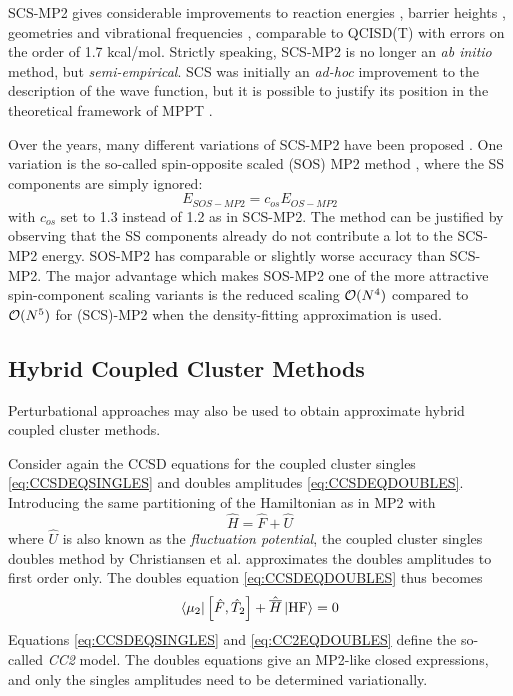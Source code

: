 SCS-MP2 gives considerable improvements to reaction energies \cite{Gri2003}, barrier heights \cite{Gou2004,Bul2004}, geometries and vibrational frequencies \cite{Ger2004}, comparable to QCISD(T) with errors on the order of 1.7 kcal/mol. Strictly speaking, SCS-MP2 is no longer an \emph{ab initio} method, but \emph{semi-empirical}. SCS was initially an \emph{ad-hoc} improvement to the description of the wave function, but it is possible to justify its position in the theoretical framework of MPPT \cite{Sza2006,Fin2010}. 

Over the years, many different variations of SCS-MP2 have been proposed \cite{Jun2004,Loc2005,Dis2007,Hil2007}. One variation is the so-called spin-opposite scaled (SOS) MP2 method \cite{Jun2004}, where the SS components are simply ignored:
\begin{equation}
E_{SOS-MP2} = c_{os} E_{OS-MP2}
\end{equation}
\noindent with $c_{os}$ set to 1.3 instead of 1.2 as in SCS-MP2. The method can be justified by observing that the SS components already do not contribute a lot to the SCS-MP2 energy. SOS-MP2 has comparable or slightly worse accuracy than SCS-MP2. The major advantage which makes SOS-MP2 one of the more attractive spin-component scaling variants is the reduced scaling $\mathcal{O}(N^{4})$ compared to $\mathcal{O}(N^{5})$ for (SCS)-MP2 when the density-fitting approximation is used.

\subsection{Hybrid Coupled Cluster Methods}

Perturbational approaches may also be used to obtain approximate hybrid coupled cluster methods. 

Consider again the CCSD equations for the coupled cluster singles \ref{eq:CCSDEQSINGLES} and doubles amplitudes \ref{eq:CCSDEQDOUBLES}. Introducing the same partitioning of the Hamiltonian as in MP2 with
\begin{equation}
\hat{H} = \hat{F} + \hat{U}
\end{equation}
\noindent where $\hat{U}$ is also known as the \emph{fluctuation potential}, the coupled cluster singles doubles method by Christiansen et al. \cite{Chr1995} approximates the doubles amplitudes to first order only. The doubles equation \ref{eq:CCSDEQDOUBLES} thus becomes
\begin{equation}
\bra{\smash{\mu_2}} \left[ \hat{F}, \hat{T}_2\right] + \hat{\overline{H}} \ket{\smash{\text{HF}}} = 0
\label{eq:CC2EQDOUBLES}
\end{equation}
\noindent Equations \ref{eq:CCSDEQSINGLES} and \ref{eq:CC2EQDOUBLES} define the so-called \emph{CC2} model. The doubles equations give an MP2-like closed expressions, and only the singles amplitudes need to be determined variationally.

